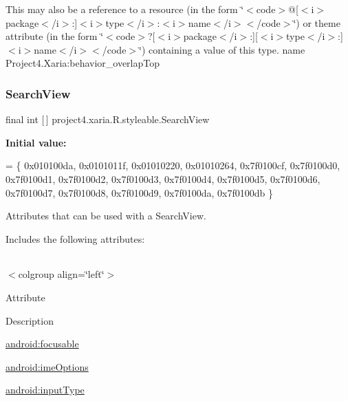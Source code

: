 This may also be a reference to a resource (in the form \char`\"{}$<$code$>$@\mbox{[}$<$i$>$package$<$/i$>$\+:\mbox{]}$<$i$>$type$<$/i$>$\+:$<$i$>$name$<$/i$>$$<$/code$>$\char`\"{}) or theme attribute (in the form \char`\"{}$<$code$>$?\mbox{[}$<$i$>$package$<$/i$>$\+:\mbox{]}\mbox{[}$<$i$>$type$<$/i$>$\+:\mbox{]}$<$i$>$name$<$/i$>$$<$/code$>$\char`\"{}) containing a value of this type.  name Project4.\+Xaria\+:behavior\+\_\+overlap\+Top \mbox{\label{classproject4_1_1xaria_1_1R_1_1styleable_a6308d960f6e1e05e5316efa4904fedfc}} 
\subsubsection{\texorpdfstring{Search\+View}{SearchView}}
{\footnotesize\ttfamily final int \mbox{[}$\,$\mbox{]} project4.\+xaria.\+R.\+styleable.\+Search\+View\hspace{0.3cm}{\ttfamily [static]}}

{\bfseries Initial value\+:}
\begin{DoxyCode}
= \{
            0x010100da, 0x0101011f, 0x01010220, 0x01010264,
            0x7f0100cf, 0x7f0100d0, 0x7f0100d1, 0x7f0100d2,
            0x7f0100d3, 0x7f0100d4, 0x7f0100d5, 0x7f0100d6,
            0x7f0100d7, 0x7f0100d8, 0x7f0100d9, 0x7f0100da,
            0x7f0100db
        \}
\end{DoxyCode}
Attributes that can be used with a Search\+View. 

Includes the following attributes\+:

\tabulinesep=1mm
\begin{longtabu} spread 0pt [c]{*{0}{|X[-1]}|}
\hline
\end{longtabu}
$<$colgroup align=\char`\"{}left\char`\"{}$>$ 

Attribute

Description 

{\ttfamily \hyperlink{classproject4_1_1xaria_1_1R_1_1styleable_aca8cb79e239b187a7e1a1c50e50fc025}{android\+:focusable}}

{\ttfamily \hyperlink{classproject4_1_1xaria_1_1R_1_1styleable_ac7730714223b84a0e0622950d9a58955}{android\+:ime\+Options}}

{\ttfamily \hyperlink{classproject4_1_1xaria_1_1R_1_1styleable_abeede1e9e7d3bcc49ce1e88e2b589cb0}{android\+:input\+Type}}

